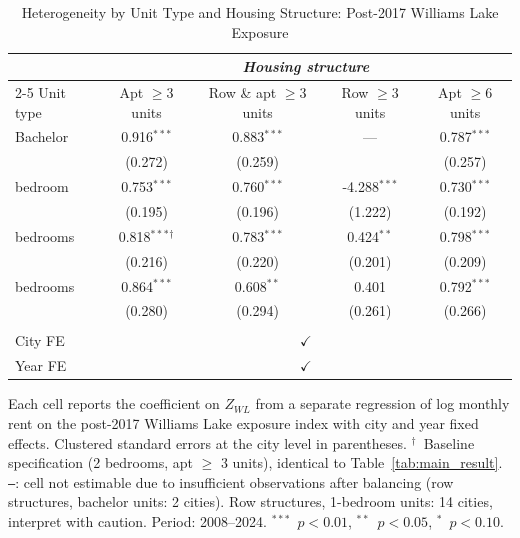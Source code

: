\begin{table}[htbp]
  \caption{Heterogeneity by Unit Type and Housing Structure: Post-2017 Williams Lake Exposure}
  \label{tab:heterogeneity_4x4}
  \bigskip
  \centering
  \begin{tabular}{lcccc}
    \toprule
    & \multicolumn{4}{c}{\textit{Housing structure}} \\
    \cmidrule(lr){2-5}
    Unit type & Apt $\geq 3$ units & Row \& apt $\geq 3$ units & Row $\geq 3$ units & Apt $\geq 6$ units \\
    \midrule
Bachelor & 0.916$^{***}$ & 0.883$^{***}$ & \multicolumn{1}{c}{---} & 0.787$^{***}$ \\
 & (0.272) & (0.259) &  & (0.257) \\
\addlinespace
1 bedroom & 0.753$^{***}$ & 0.760$^{***}$ & -4.288$^{***}$ & 0.730$^{***}$ \\
 & (0.195) & (0.196) & (1.222) & (0.192) \\
\addlinespace
2 bedrooms & 0.818$^{***}$$^{\dag}$ & 0.783$^{***}$ & 0.424$^{**}$ & 0.798$^{***}$ \\
 & (0.216) & (0.220) & (0.201) & (0.209) \\
\addlinespace
3 bedrooms & 0.864$^{***}$ & 0.608$^{**}$ & 0.401 & 0.792$^{***}$ \\
 & (0.280) & (0.294) & (0.261) & (0.266) \\
    \\
    City FE & \multicolumn{4}{c}{$\checkmark$} \\
    Year FE & \multicolumn{4}{c}{$\checkmark$} \\
    \bottomrule
  \end{tabular}
  \par\raggedright\smallskip
  \footnotesize
  Each cell reports the coefficient on $Z_{WL}$ from a separate regression of log monthly rent on the post-2017 Williams Lake exposure index with city and year fixed effects. Clustered standard errors at the city level in parentheses. $^{\dag}$~Baseline specification (2 bedrooms, apt $\geq$ 3 units), identical to Table~\ref{tab:main_result}. \texttt{---}: cell not estimable due to insufficient observations after balancing (row structures, bachelor units: 2 cities). Row structures, 1-bedroom units: 14 cities, interpret with caution. Period: 2008--2024. $^{***}$~$p<0.01$, $^{**}$~$p<0.05$, $^{*}$~$p<0.10$.
\end{table}

